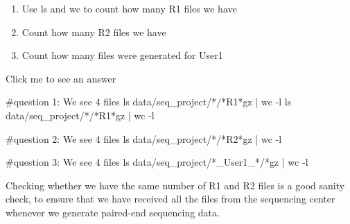 \documentclass[
  letterpaper,
  DIV=11,
  numbers=noendperiod]{scrreprt}
\newenvironment{Shaded}{}{}
\newcommand{\AttributeTok}[1]{\textcolor[rgb]{0.84,0.23,0.29}{#1}}
\newcommand{\CommentTok}[1]{\textcolor[rgb]{0.42,0.45,0.49}{#1}}
\newcommand{\FunctionTok}[1]{\textcolor[rgb]{0.44,0.26,0.76}{#1}}
\newcommand{\KeywordTok}[1]{\textcolor[rgb]{0.84,0.23,0.29}{#1}}
\newcommand{\NormalTok}[1]{\textcolor[rgb]{0.14,0.16,0.18}{#1}}
\newcommand{\PreprocessorTok}[1]{\textcolor[rgb]{0.84,0.23,0.29}{#1}}
\providecommand{\tightlist}{%
  \setlength{\itemsep}{0pt}\setlength{\parskip}{0pt}}\usepackage{longtable,booktabs,array}
\begin{document}
\begin{tcolorbox}[enhanced jigsaw, breakable, left=2mm, opacitybacktitle=0.6, coltitle=black, toprule=.15mm, colframe=quarto-callout-caution-color-frame, opacityback=0, bottomtitle=1mm, rightrule=.15mm, colback=white, toptitle=1mm, leftrule=.75mm, titlerule=0mm, bottomrule=.15mm, title=\textcolor{quarto-callout-caution-color}{\faFire}\hspace{0.5em}{Exercise}, colbacktitle=quarto-callout-caution-color!10!white, arc=.35mm]

\begin{enumerate}
\def\labelenumi{\arabic{enumi}.}
\tightlist
\item
  Use ls and wc to count how many R1 files we have
\item
  Count how many R2 files we have
\item
  Count how many files were generated for User1
\end{enumerate}

Click me to see an answer

\begin{Shaded}
\begin{Highlighting}[]
\CommentTok{\#question 1: We see 4 files}
\FunctionTok{ls}\NormalTok{ data/seq\_project/}\PreprocessorTok{*}\NormalTok{/}\PreprocessorTok{*}\NormalTok{R1}\PreprocessorTok{*}\NormalTok{gz }\KeywordTok{|} \FunctionTok{wc} \AttributeTok{{-}l} 
\FunctionTok{ls}\NormalTok{ data/seq\_project/}\PreprocessorTok{*}\NormalTok{/}\PreprocessorTok{*}\NormalTok{R1}\PreprocessorTok{*}\NormalTok{gz }\KeywordTok{|} \FunctionTok{wc} \AttributeTok{{-}l} 

\CommentTok{\#question 2: We see 4 files}
\FunctionTok{ls}\NormalTok{ data/seq\_project/}\PreprocessorTok{*}\NormalTok{/}\PreprocessorTok{*}\NormalTok{R2}\PreprocessorTok{*}\NormalTok{gz }\KeywordTok{|} \FunctionTok{wc} \AttributeTok{{-}l} 

\CommentTok{\#question 3: We see 4 files}
\FunctionTok{ls}\NormalTok{ data/seq\_project/}\PreprocessorTok{*}\NormalTok{\_User1\_}\PreprocessorTok{*}\NormalTok{/}\PreprocessorTok{*}\NormalTok{gz }\KeywordTok{|} \FunctionTok{wc} \AttributeTok{{-}l} 
\end{Highlighting}
\end{Shaded}

Checking whether we have the same number of R1 and R2 files is a good
sanity check, to ensure that we have received all the files from the
sequencing center whenever we generate paired-end sequencing data.

\end{tcolorbox}
\end{document}
